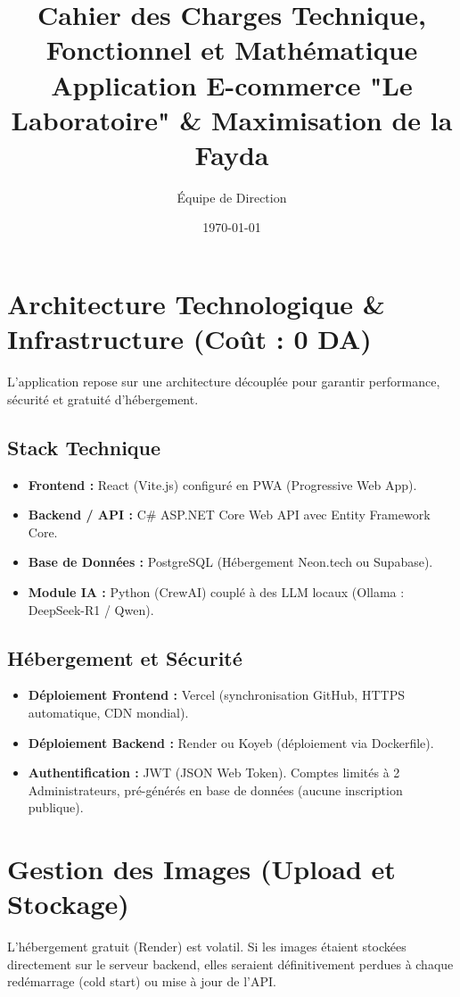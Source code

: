 \documentclass[11pt,a4paper]{article}
\title{\textbf{Cahier des Charges Technique, Fonctionnel et Mathématique}\\ \large Application E-commerce "Le Laboratoire" \& Maximisation de la Fayda}
\author{Équipe de Direction}
\date{\today}
\begin{document}
\maketitle
\tableofcontents
\newpage

\section{Architecture Technologique \& Infrastructure (Coût : 0 DA)}

L'application repose sur une architecture découplée pour garantir performance, sécurité et gratuité d'hébergement.

\subsection{Stack Technique}
\begin{itemize}
    \item \textbf{Frontend :} React (Vite.js) configuré en PWA (Progressive Web App).
    \item \textbf{Backend / API :} C\# ASP.NET Core Web API avec Entity Framework Core.
    \item \textbf{Base de Données :} PostgreSQL (Hébergement Neon.tech ou Supabase).
    \item \textbf{Module IA :} Python (CrewAI) couplé à des LLM locaux (Ollama : DeepSeek-R1 / Qwen).
\end{itemize}

\subsection{Hébergement et Sécurité}
\begin{itemize}
    \item \textbf{Déploiement Frontend :} Vercel (synchronisation GitHub, HTTPS automatique, CDN mondial).
    \item \textbf{Déploiement Backend :} Render ou Koyeb (déploiement via Dockerfile).
    \item \textbf{Authentification :} JWT (JSON Web Token). Comptes limités à 2 Administrateurs, pré-générés en base de données (aucune inscription publique).
\end{itemize}

\section{Gestion des Images (Upload et Stockage)}

L'hébergement gratuit (Render) est volatil. Si les images étaient stockées directement sur le serveur backend, elles seraient définitivement perdues à chaque redémarrage (cold start) ou mise à jour de l'API.
\end{document}
